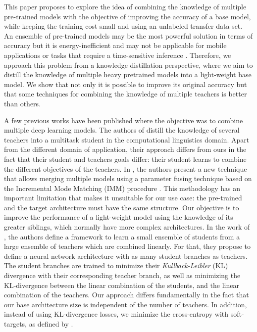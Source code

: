 \documentclass{elsarticle}
\begin{document}
	
	 This paper proposes to explore the idea of combining the knowledge of multiple pre-trained models with the objective of improving the accuracy of a base model, while keeping the training cost small and using an unlabeled transfer data set. 	An ensemble of pre-trained models may be the most powerful solution in terms of accuracy but it is energy-inefficient and may not be applicable for mobile applications or tasks that require a time-sensitive inference \cite{sanchez2020}. Therefore, we approach this problem from a knowledge distillation perspective, where we aim to distill the knowledge of multiple heavy pretrained models into a light-weight base model. We show that not only it is possible to improve its original accuracy but that some techniques for combining the knowledge of multiple teachers is better than others. 
	
	A few previous works have been published where the objective was to combine multiple deep learning models. The authors of \cite{liu2020} distill the knowledge of several teachers into a multitask student in the computational linguistics domain. Apart from the different domain of application, their approach differs from ours in the fact that their student and teachers goals differ: their student learns to combine the different objectives of the teachers. In \cite{geyer2019}, the authors present a new technique that allows merging multiple models using a parameter fusing technique based on the Incremental Mode Matching (IMM) procedure \cite{lee2017}. This methodology has an important limitation that makes it unsuitable for our use case: the pre-trained and the target architecture must have the same structure. Our objective is to improve the performance of a light-weight model using the knowledge of its greater siblings, which normally have more complex architectures. In the work of \cite{asif2019}, the authors define a framework to learn a small ensemble of students from a large ensemble of teachers which are combined linearly. For that, they propose to define a neural network architecture with as many student branches as teachers. The student branches are trained to minimize their \textit{Kullback-Leibler} (KL) divergence with their corresponding teacher branch, as well as minimizing the KL-divergence between the linear combination of the students, and the linear combination of the teachers. Our approach differs fundamentally in the fact that our base architecture size is independent of the number of teachers. In addition, instead of using KL-divergence losses, we minimize the cross-entropy with soft-targets, as defined by \cite{hinton2015}.
	
\end{document}

